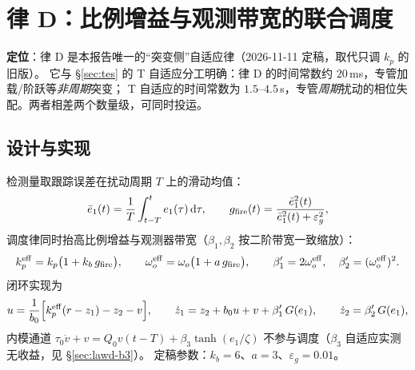 \documentclass[11pt,a4paper]{article}
\theoremstyle{remark}\newtheorem{remark}{注}
\begin{document}
\section{律 D：比例增益与观测带宽的联合调度}\label{sec:lawd}
\noindent\textbf{定位}：律 D 是本报告唯一的“突变侧”自适应律（2026-11-11 定稿，取代只调 $k_p$ 的旧版）。
它与 §\ref{sec:tes} 的 T 自适应分工明确：律 D 的时间常数约 $20$\,ms，专管加载/阶跃等\emph{非周期}突变；
T 自适应的时间常数为 $1.5$--$4.5$\,s，专管\emph{周期}扰动的相位失配。两者相差两个数量级，可同时投运。

\subsection{设计与实现}\label{sec:lawd-design}
检测量取跟踪误差在扰动周期 $T$ 上的滑动均值：
\begin{equation}
\bar e_1(t)=\frac1T\int_{t-T}^{t}e_1(\tau)\,\mathrm d\tau,\qquad
g_{\rm fire}(t)=\frac{\bar e_1^2(t)}{\bar e_1^2(t)+\varepsilon_g^2},
\label{eq:lawd-gate}
\end{equation}
调度律同时抬高比例增益与观测器带宽（$\beta_1,\beta_2$ 按二阶带宽一致缩放）：
\begin{equation}
k_p^{\rm eff}=k_p\bigl(1+k_b\,g_{\rm fire}\bigr),\qquad
\omega_o^{\rm eff}=\omega_o\bigl(1+a\,g_{\rm fire}\bigr),\qquad
\beta_1'=2\omega_o^{\rm eff},\quad \beta_2'=(\omega_o^{\rm eff})^{2}.
\label{eq:lawd-eff}
\end{equation}
闭环实现为
\begin{equation}
u=\frac{1}{b_0}\Bigl[k_p^{\rm eff}(r-z_1)-z_2-v\Bigr],\qquad
\dot z_1=z_2+b_0u+v+\beta_1'\,G(e_1),\qquad
\dot z_2=\beta_2'\,G(e_1),
\label{eq:lawd-law}
\end{equation}
内模通道 $\tau_0\dot v+v=Q_0v(t-T)+\beta_3\tanh(e_1/\zeta)$ 不参与调度（$\beta_3$ 自适应实测无收益，见 §\ref{sec:lawd-b3}）。
定稿参数：$k_b=6$、$a=3$、$\varepsilon_g=0.01$。
\end{document}
